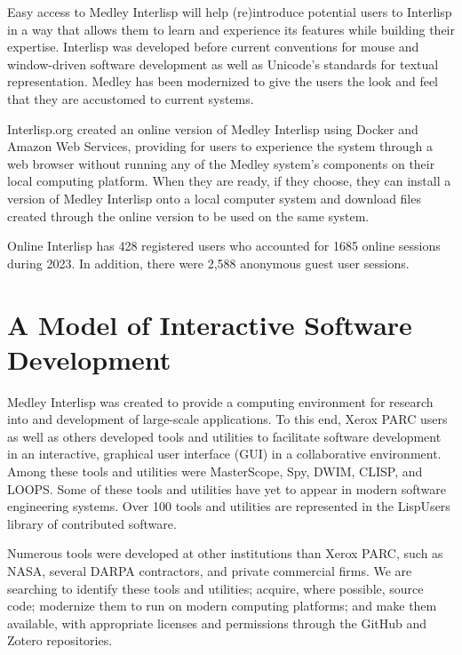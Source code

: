 \documentclass[sigconf]{acmart}
\begin{document}
Easy access to Medley Interlisp will help (re)introduce potential users to Interlisp in a way that allows them to learn and experience its features while building their expertise. Interlisp was developed before current conventions for mouse and window-driven software development as well as Unicode's standards for textual representation. Medley has been modernized to give the users the look and feel that they are accustomed to current systems.


Interlisp.org created an online version of Medley Interlisp using Docker and Amazon Web Services, providing for users to experience the system through a web browser without running any of the Medley system's components on their local computing platform. When they are ready, if they choose, they can install a version of Medley Interlisp onto a local computer system and download files created through the online version to be used on the same system.

Online Interlisp has 428 registered users who accounted for 1685 online sessions during 2023. In addition, there were 2,588 anonymous guest user sessions.

\section{A Model of Interactive Software Development}

Medley Interlisp was created to provide a computing environment for research into and development of large-scale applications. To this end, Xerox PARC users as well as others developed tools and utilities to facilitate software development in an interactive, graphical user interface (GUI) in a collaborative environment.\cite{Kaisler2021} Among these tools and utilities were MasterScope, Spy, DWIM, CLISP, and LOOPS. Some of these tools and utilities have yet to appear in modern software engineering systems. Over 100 tools and utilities are represented in the LispUsers library of contributed software.

Numerous tools were developed at other institutions than Xerox PARC, such as NASA, several DARPA contractors, and private commercial firms. We are searching to identify these tools and utilities; acquire, where possible, source code; modernize them to run on modern computing platforms; and make them available, with appropriate licenses and permissions through the GitHub and Zotero repositories.

\end{document}
